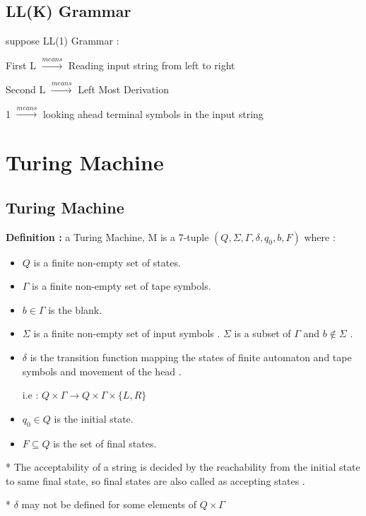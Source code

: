 \documentclass[12pt]{book}
\begin{document}
\section{LL(K) Grammar}

suppose LL(1) Grammar :

First L $\xrightarrow{means}$ Reading input string from left to right

Second L  $\xrightarrow{means}$ Left Most Derivation

1 $\xrightarrow{means}$ looking ahead terminal symbols in the input string



\chapter{Turing Machine}

\section{Turing Machine}

\textbf{Definition :} a Turing Machine, M is a 7-tuple $(Q ,\Sigma , \Gamma , \delta , q_{0} , b , F)$ where :

\begin{itemize}
	\item $Q$ is a finite non-empty set of states.
	\item $\Gamma$ is a finite non-empty set of tape symbols.
	\item $b \in \Gamma$ is the blank.
	\item $\Sigma$ is a finite non-empty set of input symbols . $\Sigma$ is a subset of $\Gamma$ and $b \notin \Sigma$ .
	\item $\delta$ is the transition function mapping the states of finite automaton and tape symbols and movement of the head .
	
	i.e : $Q \times \Gamma \to Q \times \Gamma \times \{ L , R \}$
	\item $q_{0} \in Q$ is the initial state.
	\item $F \subseteq Q$ is the set of final states.
\end{itemize}


* The acceptability of a string is decided by the reachability from the initial state to same final state, so final states are also called as accepting states .

* $\delta$ may not be defined for some elements of $Q \times \Gamma$
\end{document}
